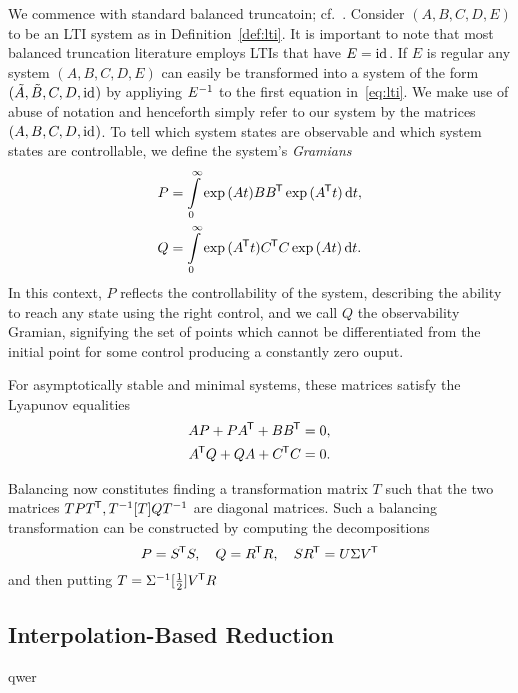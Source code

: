 We commence with standard balanced truncatoin; cf.~\cite{BB2017}.
Consider $(A, B, C, D, E)$ to be an LTI system as in Definition~\ref{def:lti}.
It is important to note that most balanced truncation literature employs LTIs that have $E = \text{id}_{}$.
If $E$ is regular any system $(A, B, C, D, E)$ can easily be transformed into a system of the form $(\tilde{A}, \tilde{B}, C, D, \text{id}_{})$ by appliying $E^{-1}$ to the first equation in~\eqref{eq:lti}.
We make use of abuse of notation and henceforth simply refer to our system by the matrices $(A, B, C, D, \text{id}_{})$.
To tell which system states are observable and which system states are controllable, we define the system's \emph{Gramians}
\begin{align}
    P &= \int\limits_0^\infty \exp{(A t)} B B^{\mkern-1.5mu \mathsf{T}} \exp{(A^{\mkern-1.5mu \mathsf{T}}t)} \mathop{}\!\mathrm{d} t,\label{eq:controllability-gramian} \\
    Q &= \int\limits_0^\infty \exp{(A^{\mkern-1.5mu \mathsf{T}}t)} C^{\mkern-1.5mu \mathsf{T}} C \exp{(A t)} \mathop{}\!\mathrm{d} t.\label{eq:observability-gramian}
\end{align}
In this context, $P$ reflects the controllability of the system, describing the ability to reach any state using the right control, and we call $Q$ the observability Gramian, signifying the set of points which cannot be differentiated from the initial point for some control producing a constantly zero ouput.



For asymptotically stable and minimal systems, these matrices satisfy the Lyapunov equalities
\begin{align*}
    A P + P A^{\mkern-1.5mu \mathsf{T}} + B B^{\mkern-1.5mu \mathsf{T}} &= 0, \\
    A^{\mkern-1.5mu \mathsf{T}} Q + Q A + C^{\mkern-1.5mu \mathsf{T}} C &= 0.
\end{align*}


Balancing now constitutes finding a transformation matrix $T$ such that the two matrices $T P T^{\mkern-1.5mu \mathsf{T}}, T^{-1}[T] Q T^{-1}$ are diagonal matrices.
Such a balancing transformation can be constructed by computing the decompositions
\begin{equation*}
    P = S^{\mkern-1.5mu \mathsf{T}} S,\quad Q = R^{\mkern-1.5mu \mathsf{T}} R,\quad S R^{\mkern-1.5mu \mathsf{T}} = U \Sigma V^{\mkern-1.5mu \mathsf{T}}
\end{equation*}
and then putting $T = \Sigma^{-1}[\frac{1}{2}] V^{\mkern-1.5mu \mathsf{T}} R$

\subsection{Interpolation-Based Reduction}\label{subsec:interpolation-reduction}

qwer
